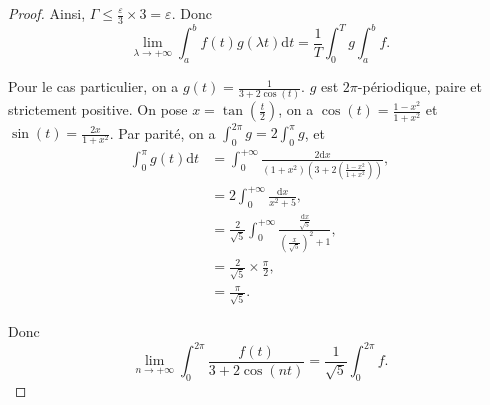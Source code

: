 \begin{proof}
    Ainsi, $\Gamma\leqslant\frac{\varepsilon}{3}\times 3=\varepsilon$. Donc 
    \begin{equation}
        \boxed{
            \lim\limits_{\lambda\to+\infty}\int_{a}^{b}f(t)g(\lambda t)\mathrm{d}t=\frac{1}{T}\int_{0}^{T}g\int_{a}^{b}f.
        }
    \end{equation}

    Pour le cas particulier, on a $g(t)=\frac{1}{3+2\cos(t)}$. $g$ est $2\pi$-périodique, paire et strictement positive. On pose $x=\tan\left(\frac{t}{2}\right)$, on a $\cos(t)=\frac{1-x^{2}}{1+x^{2}}$ et $\sin(t)=\frac{2x}{1+x^{2}}$. Par parité, on a $\int_{0}^{2\pi}g=2\int_{0}^{\pi}g$, et 
    \begin{align}
        \int_{0}^{\pi}g(t)\mathrm{d}t
        &=\int_{0}^{+\infty}\frac{2\mathrm{d}x}{(1+x^{2})\left(3+2\left(\frac{1-x^{2}}{1+x^{2}}\right)\right)},\\
        &= 2\int_{0}^{+\infty}\frac{\mathrm{d}x}{x^{2}+5},\\
        &= \frac{2}{\sqrt{5}}\int_{0}^{+\infty}\frac{\frac{\mathrm{d}x}{\sqrt{5}}}{\left(\frac{x}{\sqrt{5}}\right)^{2}+1},\\
        &= \frac{2}{\sqrt{5}}\times\frac{\pi}{2},\\
        &=\frac{\pi}{\sqrt{5}}.
    \end{align}

    Donc 
    \begin{equation}
        \boxed{
            \lim\limits_{n\to+\infty}\int_{0}^{2\pi}\frac{f(t)}{3+2\cos(nt)}=\frac{1}{\sqrt{5}}\int_{0}^{2\pi}f.
        }
    \end{equation}
\end{proof}


